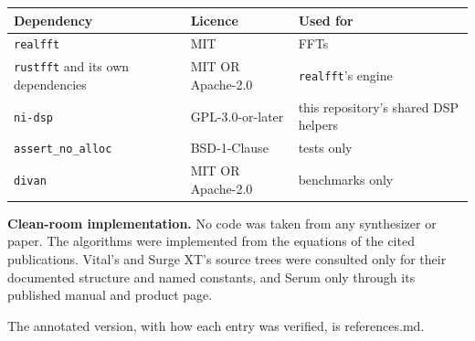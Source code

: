 \documentclass[conference]{IEEEtran}
\begin{document}
\begin{table}[t]
\centering\footnotesize
\begin{tabularx}{\textwidth}{@{}>{\raggedright\arraybackslash}Xl>{\raggedright\arraybackslash}X@{}}
\toprule
\textbf{Dependency} & \textbf{Licence} & \textbf{Used for} \\
\midrule
\texttt{realfft} & MIT & FFTs \\
\texttt{rustfft} and its own dependencies & MIT OR Apache-2.0 & \texttt{realfft}'s engine \\
\texttt{ni-dsp} & GPL-3.0-or-later & this repository's shared DSP helpers \\
\texttt{assert\_\allowbreak{}no\_\allowbreak{}alloc} & BSD-1-Clause & tests only \\
\texttt{divan} & MIT OR Apache-2.0 & benchmarks only \\
\bottomrule
\end{tabularx}
\end{table}

\textbf{Clean-room implementation.} No code was taken from any synthesizer or paper. The algorithms were implemented from the equations of the cited publications. Vital's and Surge XT's source trees were consulted only for their documented structure and named constants, and Serum only through its published manual and product page.

\bigskip\noindent
The annotated version, with how each entry was verified, is references.md.
\end{document}
